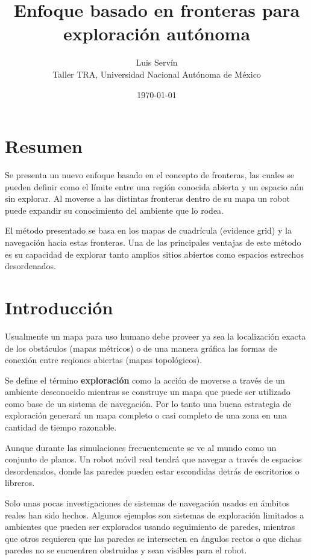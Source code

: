 \documentclass[12pt]{article}
\title{\vspace{-2ex}Enfoque basado en fronteras para exploración autónoma\vspace{-2ex}}
\date{\today}
\author{Luis Servín\\ Taller TRA, Universidad Nacional Autónoma de México}
\begin{document}
\maketitle

\section*{Resumen}

Se presenta un nuevo enfoque basado en el concepto de fronteras, las cuales se pueden definir como el límite entre una región conocida abierta y un espacio aún sin explorar. Al moverse a las distintas fronteras dentro de su mapa un robot puede expandir su conocimiento del ambiente que lo rodea. 

El método presentado se basa en los mapas de cuadrícula (evidence grid) y la navegación hacia estas fronteras. Una de las principales ventajas de este método es su capacidad de explorar tanto amplios sitios abiertos como espacios estrechos desordenados.

\section{Introducción}

Usualmente un mapa para uso humano debe proveer ya sea la localización exacta de los obstáculos (mapas métricos) o de una manera gráfica las formas de conexión entre reqiones abiertas (mapas topológicos). 

Se define el término \textbf{exploración} como la acción de moverse a través de un ambiente desconocido mientras se construye un mapa que puede ser utilizado como base de un sistema de navegación. Por lo tanto una buena estrategia de exploración generará un mapa completo o casi completo de una zona en una cantidad de tiempo razonable.

Aunque durante las simulaciones frecuentemente se ve al mundo como un conjunto de planos. Un robot móvil real tendrá que navegar a través de espacios desordenados, donde las paredes pueden estar escondidas detrás de escritorios o libreros.

Solo unas pocas investigaciones de sistemas de navegación usados en ámbitos reales han sido hechos. Algunos ejemplos son sistemas de exploración limitados a ambientes que pueden ser explorados usando seguimiento de paredes, mientras que otros requieren que las paredes se intersecten en ángulos rectos o que dichas paredes no se encuentren obstruidas y sean visibles para el robot.
\end{document}

